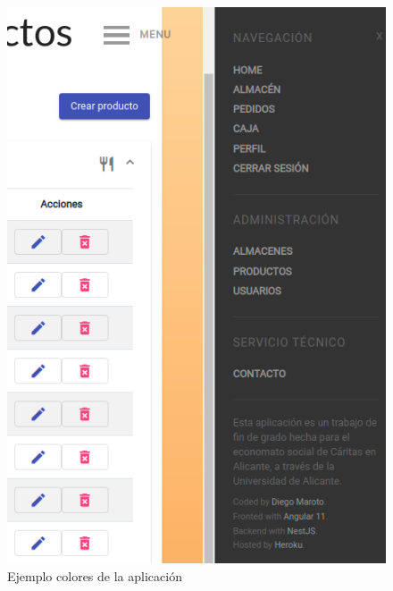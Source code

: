 \begin{figure}[h]
\centering
\includegraphics[scale=0.8]{archivos/decision_cromatica.png}
\caption{Ejemplo colores de la aplicación}
\label{fig:decision_cromatica}
\end{figure}
\clearpage

